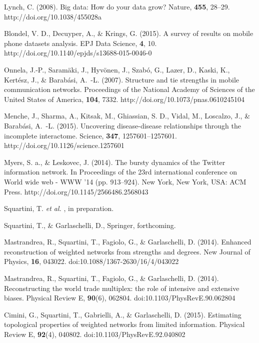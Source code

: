 \documentclass[aps,twocolumn,superscriptaddress]{revtex4-1}
\newcommand{\etal}{\emph{et al.} }
\begin{document}
\begin{thebibliography}{99}
 Lynch, C. (2008). Big data: How do your data grow? Nature, {\bf 455}, 28--29. http://doi.org/10.1038/455028a


 Blondel, V. D., Decuyper, A., \& Krings, G. (2015). A survey of results on mobile phone datasets analysis. EPJ Data Science, {\bf 4}, 10. http://doi.org/10.1140/epjds/s13688-015-0046-0

 Onnela, J.-P., Saram\"aki, J., Hyv\"onen, J., Szab\'o, G., Lazer, D., Kaski, K., Kert\'esz, J., \& Barab\'asi, A.~-L. (2007). Structure and tie strengths in mobile communication networks. Proceedings of the National Academy of Sciences of the United States of America, {\bf 104}, 7332. http://doi.org/10.1073/pnas.0610245104


 Menche, J., Sharma, A., Kitsak, M., Ghiassian, S. D., Vidal, M., Loscalzo, J., \& Barab\'asi, A.~-L. (2015). Uncovering disease-disease relationships through the incomplete interactome. Science, {\bf 347}, 1257601--1257601. http://doi.org/10.1126/science.1257601


 Myers, S. a., \& Leskovec, J. (2014). The bursty dynamics of the Twitter information network. In Proceedings of the 23rd international conference on World wide web - WWW '14 (pp. 913--924). New York, New York, USA: ACM Press. http://doi.org/10.1145/2566486.2568043

Squartini, T. \etal, in preparation.

Squartini, T., \& Garlaschelli, D., Springer, forthcoming. 

 Mastrandrea, R., Squartini, T., Fagiolo, G., \& Garlaschelli, D. (2014). Enhanced reconstruction of weighted networks from strengths and degrees. New Journal of Physics, {\bf 16}, 043022. doi:10.1088/1367-2630/16/4/043022

Mastrandrea, R., Squartini, T., Fagiolo, G., \& Garlaschelli, D. (2014). Reconstructing the world trade multiplex: the role of intensive and extensive biases. Physical Review E, {\bf 90}(6), 062804.
doi:10.1103/PhysRevE.90.062804

Cimini, G., Squartini, T., Gabrielli, A., \& Garlaschelli, D. (2015). Estimating topological properties of weighted networks from limited information. Physical Review E, {\bf 92}(4), 040802.
doi:10.1103/PhysRevE.92.040802


\end{thebibliography}
\end{document}
